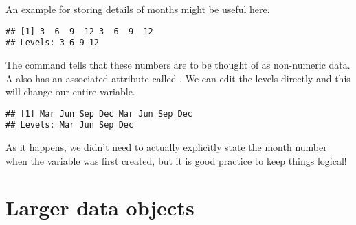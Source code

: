 An example for storing details of months might be useful here. 
\begin{knitrout}
\color{fgcolor}\begin{kframe}
\begin{alltt}
 \hlkwb{=} \hlstd{(}\hlstd{(}\hlstd{,}\hlstd{,}\hlstd{,}\hlstd{,}\hlstd{,}\hlstd{,}\hlstd{,}\hlstd{))}
\end{alltt}
\begin{verbatim}
## [1] 3  6  9  12 3  6  9  12
## Levels: 3 6 9 12
\end{verbatim}
\end{kframe}
\end{knitrout}
The  command tells \R{} that these numbers are to be thought of as non-numeric data. A  also has an associated attribute called . We can edit the levels directly and this will change our entire variable. \label{UseOfLevels} 
\begin{knitrout}
\color{fgcolor}\begin{kframe}
\begin{alltt}
 \hlkwb{=} \hlstd{(}\hlstd{,} \hlstd{,} \hlstd{,} \hlstd{)}
\end{alltt}
\begin{verbatim}
## [1] Mar Jun Sep Dec Mar Jun Sep Dec
## Levels: Mar Jun Sep Dec
\end{verbatim}
\end{kframe}
\end{knitrout}
As it happens, we didn't need to actually explicitly state the month number when the variable was first created, but it is good practice to keep things logical! 
 
\section{Larger data objects} 
 
